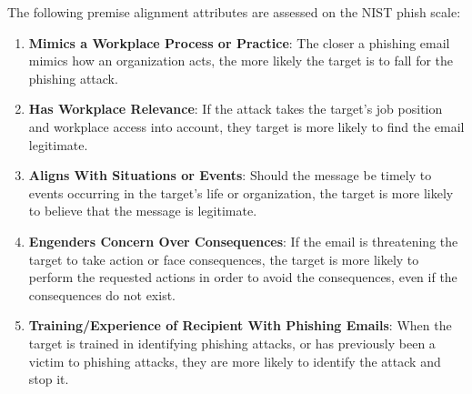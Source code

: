 \begin{fullwidth}
The following premise alignment attributes are assessed on the NIST phish scale:
\begin{enumerate}
    \item \textbf{Mimics a Workplace Process or Practice}: The closer a phishing email mimics how an organization acts, the more likely the target is to fall for the phishing attack.
    \item \textbf{Has Workplace Relevance}: If the attack takes the target's job position and workplace access into account, they target is more likely to find the email legitimate.
    \item \textbf{Aligns With Situations or Events}: Should the message be timely to events occurring in the target's life or organization, the target is more likely to believe that the message is legitimate.
    \item \textbf{Engenders Concern Over Consequences}: If the email is threatening the target to take action or face consequences, the target is more likely to perform the requested actions in order to avoid the consequences, even if the consequences do not exist.
    \item \textbf{Training/Experience of Recipient With Phishing Emails}: When the target is trained in identifying phishing attacks, or has previously been a victim to phishing attacks, they are more likely to identify the attack and stop it.
\end{enumerate}

\end{fullwidth}